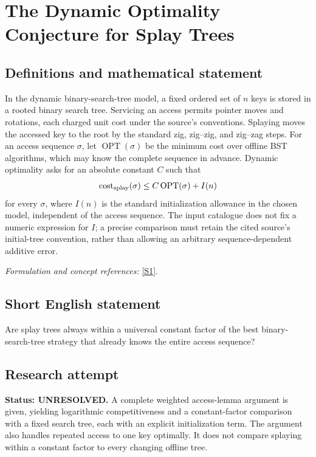 \documentclass[11pt]{article}
\begin{document}
\section*{\texorpdfstring{The Dynamic Optimality Conjecture for Splay Trees}{The Dynamic Optimality Conjecture for Splay Trees}}\label{30006848}
\subsection{Definitions and mathematical statement}
In the dynamic binary-search-tree model, a fixed ordered set of $n$ keys is stored in a rooted binary search tree. Servicing an access permits pointer moves and rotations, each charged unit cost under the source's conventions. Splaying moves the accessed key to the root by the standard zig, zig--zig, and zig--zag steps. For an access sequence $\sigma$, let $\operatorname{OPT}(\sigma)$ be the minimum cost over offline BST algorithms, which may know the complete sequence in advance. Dynamic optimality asks for an absolute constant $C$ such that
\[
 \operatorname{cost}_{\rm splay}(\sigma)
 \le C\operatorname{OPT}(\sigma)+I(n)
\]
for every $\sigma$, where $I(n)$ is the standard initialization allowance in the chosen model, independent of the access sequence. The input catalogue does not fix a numeric expression for $I$; a precise comparison must retain the cited source's initial-tree convention, rather than allowing an arbitrary sequence-dependent additive error.
\par\smallskip\textit{Formulation and concept references:} \href{https://arxiv.org/abs/2607.18498}{[S1]}.

\subsection{Short English statement}
Are splay trees always within a universal constant factor of the best binary-search-tree strategy that already knows the entire access sequence?
\subsection{Research attempt}
\textbf{Status: UNRESOLVED.} A complete weighted access-lemma argument is given, yielding logarithmic competitiveness and a constant-factor comparison with a fixed search tree, each with an explicit initialization term. The argument also handles repeated access to one key optimally. It does not compare splaying within a constant factor to every changing offline tree.
\end{document}
